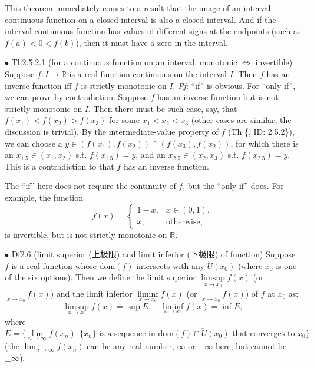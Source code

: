 \documentclass{article}
\begin{document}
\begin{Rmk}{}
    \textcolor{Th}{This theorem immediately comes to a result that the image of an interval-continuous function on a closed interval is also a closed interval. And if the interval-continuous function has values of different signs at the endpoints (such as $f(a)<0<f(b)$), then it must have a zero in the interval.}
\end{Rmk}

\begin{Th}{$\bullet$ Th2.5.2.1 (for a continuous function on an interval, monotonic $\Leftrightarrow$ invertible)}
    Suppose $f: I\rightarrow\mathbb{R}$ is a real function continuous on the interval $I$. Then $f$ has an inverse function iff $f$ is strictly monotonic on $I$.
    \tcblower
    \textit{Pf}: ``if'' is obvious. For ``only if'', we can prove by contradiction. Suppose $f$ has an inverse function but is not strictly monotonic on $I$. Then there must be such case, say, that $f(x_1) < f(x_2) > f(x_3)$ for some $x_1<x_2<x_3$ (other cases are similar, the discussion is trivial). By the intermediate-value property of $f$ (Th \{, ID: 2.5.2\}), we can choose a $y\in(f(x_1), f(x_2))\cap (f(x_3), f(x_2))$, for which there is an $x_{1.5}\in (x_1, x_2)$ s.t. $f(x_{1.5}) = y$, and an $x_{2.5}\in (x_2, x_3)$ s.t. $f(x_{2.5}) = y$. This is a contradiction to that $f$ has an inverse function.
\end{Th}

\begin{Rmk}{}
    \textcolor{Th}{The ``if'' here does not require the continuity of $f$, but the ``only if'' does. For example, the function
    $$f(x) = \begin{cases}
        1-x, & x\in (0,1),\\
        x, & \text{otherwise},
    \end{cases}$$
    is invertible, but is not strictly monotonic on $\mathbb{R}$.}
\end{Rmk}

\begin{Df}{$\bullet$ Df2.6 (limit superior (上极限) and limit inferior (下极限) of function)}
    Suppose $f$ is a real function whose $\text{dom}(f)$ intersects with any $\check{U}(x_0)$ (where $x_0$ is one of the six options). Then we define the limit superior $\limsup\limits_{x\to x_0} f(x)$ (or $\mathop{\overline{\lim}}\limits_{x\to x_0}f(x)$) and the limit inferior $\liminf\limits_{x\to x_0} f(x)$ (or $\mathop{\underline{\lim}}\limits_{x\to x_0}f(x)$) of $f$ at $x_0$ as:
    $$\limsup\limits_{x\to x_0} f(x) = \sup E, \quad \liminf\limits_{x\to x_0} f(x) = \inf E,$$
    where 
    $$E = \{\lim\limits_{n\to\infty} f(x_n): \{x_n\}\text{ is a sequence in }\text{dom}(f)\cap\check{U}(x_0)\text{ that converges to } x_0\}$$ 
    (the $\lim_{n\to\infty} f(x_n)$ can be any real number, $\infty$ or $-\infty$ here, but cannot be $\pm\infty$).
\end{Df}
\end{document}
